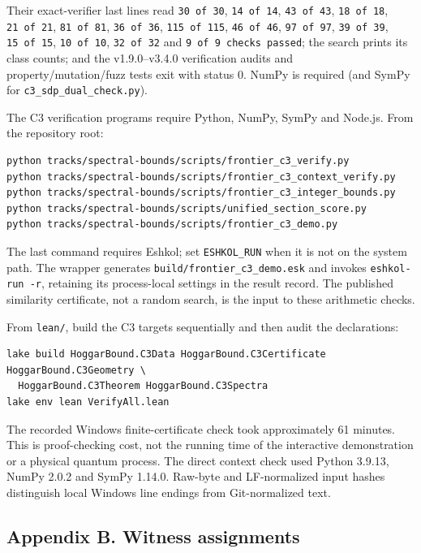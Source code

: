 \documentclass[11pt,a4paper]{article}
\begin{document}
Their exact-verifier last lines read \texttt{30\ of\ 30}, \texttt{14\ of\ 14}, \texttt{43\ of\ 43}, \texttt{18\ of\ 18}, \texttt{21\ of\ 21},
\texttt{81\ of\ 81}, \texttt{36\ of\ 36}, \texttt{115\ of\ 115}, \texttt{46\ of\ 46}, \texttt{97\ of\ 97}, \texttt{39\ of\ 39}, \texttt{15\ of\ 15}, \texttt{10\ of\ 10},
\texttt{32\ of\ 32} and \texttt{9\ of\ 9\ checks\ passed}; the search prints its class counts; and the v1.9.0--v3.4.0 verification
audits and property/mutation/fuzz tests exit with status 0. NumPy is required (and SymPy for
\nolinkurl{c3_sdp_dual_check.py}).

The C3 verification programs require Python, NumPy, SymPy and Node.js. From the repository root:

\begin{verbatim}
python tracks/spectral-bounds/scripts/frontier_c3_verify.py
python tracks/spectral-bounds/scripts/frontier_c3_context_verify.py
python tracks/spectral-bounds/scripts/frontier_c3_integer_bounds.py
python tracks/spectral-bounds/scripts/unified_section_score.py
python tracks/spectral-bounds/scripts/frontier_c3_demo.py
\end{verbatim}

The last command requires Eshkol; set \texttt{ESHKOL\_RUN} when it is not on the system path. The wrapper
generates \nolinkurl{build/frontier_c3_demo.esk} and invokes \texttt{eshkol-run\ -r}, retaining its process-local
settings in the result record. The published similarity certificate, not a random search, is the
input to these arithmetic checks.

From \texttt{lean/}, build the C3 targets sequentially and then audit the declarations:

\begin{verbatim}
lake build HoggarBound.C3Data HoggarBound.C3Certificate HoggarBound.C3Geometry \
  HoggarBound.C3Theorem HoggarBound.C3Spectra
lake env lean VerifyAll.lean
\end{verbatim}

The recorded Windows finite-certificate check took approximately 61 minutes. This is proof-checking
cost, not the running time of the interactive demonstration or a physical quantum process. The direct
context check used Python 3.9.13, NumPy 2.0.2 and SymPy 1.14.0. Raw-byte and LF-normalized input hashes
distinguish local Windows line endings from Git-normalized text.

\subsection{Appendix B. Witness assignments}\label{appendix-b-witness-assignments}
\end{document}
